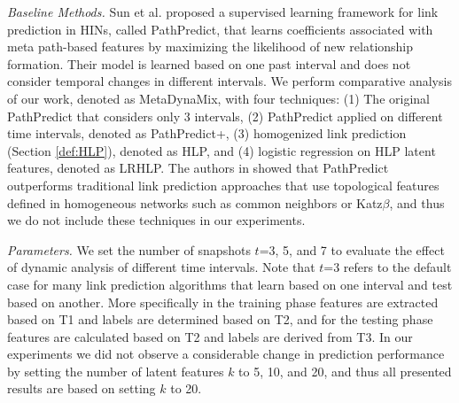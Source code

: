 





\textit{Baseline Methods.} Sun et al. \cite{sun2011ASONAM} proposed a supervised learning framework for link prediction in HINs, called {PathPredict}, that learns coefficients associated with meta path-based features by maximizing the likelihood of new relationship formation. Their model is learned based on one past interval and does not consider temporal changes in different intervals. We perform comparative analysis of our work, denoted as {MetaDynaMix}, with four techniques: (1) The original {PathPredict} that considers only 3 intervals, (2) PathPredict applied on different time intervals, denoted as {PathPredict+}, (3) homogenized link prediction (Section \ref{def:HLP}), denoted as {HLP}, and (4) logistic regression on HLP latent features, denoted as {LRHLP}. %
The authors in \cite{sun2011ASONAM} showed that {PathPredict} outperforms traditional link prediction approaches that use topological features defined in homogeneous networks such as common neighbors or Katz$\beta$, and thus we do not include these techniques in our experiments.




\textit{Parameters.} We set the number of snapshots $t$=3, 5, and 7 to evaluate the effect of dynamic analysis of different time intervals. Note that $t$=3 refers to the default case for many link prediction algorithms that learn based on one interval and test based on another. More specifically in the training phase features are extracted based on T1 and labels are determined based on T2, and for the testing phase features are calculated based on T2 and labels are derived from T3. In our experiments we did not observe a considerable change in prediction performance by setting the number of latent features $k$ to 5, 10, and 20, and thus all presented results are based on setting $k$ to 20. %

